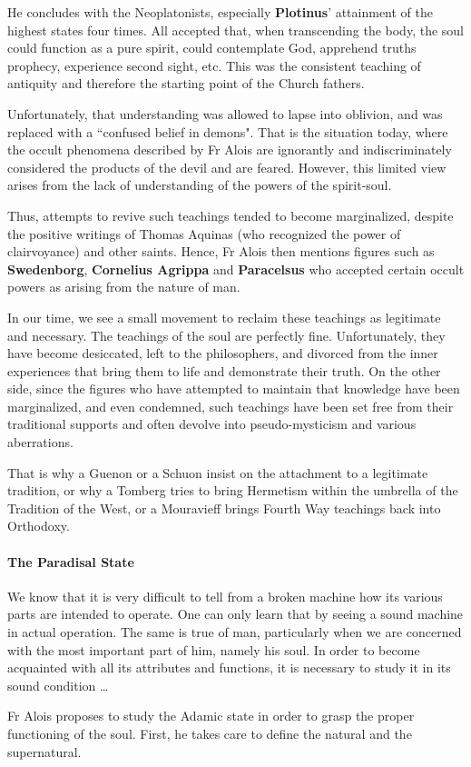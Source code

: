 He concludes with the Neoplatonists, especially \textbf{Plotinus}' attainment of the highest states four times. All accepted that, when transcending the body, the soul could function as a pure spirit, could contemplate God, apprehend truths prophecy, experience second sight, etc. This was the consistent teaching of antiquity and therefore the starting point of the Church fathers.

Unfortunately, that understanding was allowed to lapse into oblivion, and was replaced with a ``confused belief in demons". That is the situation today, where the occult phenomena described by Fr Alois are ignorantly and indiscriminately considered the products of the devil and are feared. However, this limited view arises from the lack of understanding of the powers of the spirit-soul.

Thus, attempts to revive such teachings tended to become marginalized, despite the positive writings of Thomas Aquinas (who recognized the power of clairvoyance) and other saints. Hence, Fr Alois then mentions figures such as \textbf{Swedenborg}, \textbf{Cornelius Agrippa} and \textbf{Paracelsus} who accepted certain occult powers as arising from the nature of man.

In our time, we see a small movement to reclaim these teachings as legitimate and necessary. The teachings of the soul are perfectly fine. Unfortunately, they have become desiccated, left to the philosophers, and divorced from the inner experiences that bring them to life and demonstrate their truth. On the other side, since the figures who have attempted to maintain that knowledge have been marginalized, and even condemned, such teachings have been set free from their traditional supports and often devolve into pseudo-mysticism and various aberrations.

That is why a Guenon or a Schuon insist on the attachment to a legitimate tradition, or why a Tomberg tries to bring Hermetism within the umbrella of the Tradition of the West, or a Mouravieff brings Fourth Way teachings back into Orthodoxy.


\paragraph{The Paradisal State}

\begin{quotex}
We know that it is very difficult to tell from a broken machine how its various parts are intended to operate. One can only learn that by seeing a sound machine in actual operation. The same is true of man, particularly when we are concerned with the most important part of him, namely his soul. In order to become acquainted with all its attributes and functions, it is necessary to study it in its sound condition … 

\end{quotex}
Fr Alois proposes to study the Adamic state in order to grasp the proper functioning of the soul. First, he takes care to define the natural and the supernatural.

